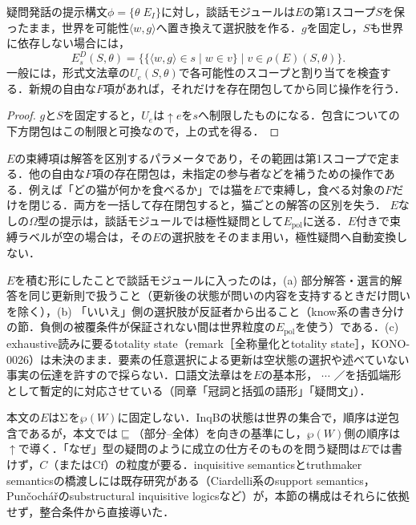 \documentclass[../../main-detail.tex]{subfiles}
\begin{document}
\begin{proposition}
    疑問発話の提示構文$\phi=\{\theta\;E_I\}$に対し，談話モジュールは$E$の第1スコープ$S$を保ったまま，世界を可能性$\langle w,g\rangle$へ置き換えて選択肢を作る．$g$を固定し，$S$も世界に依存しない場合には，
    \[
        E^D_s(S,\theta)=\{\{\langle w,g\rangle\in s\mid w\in v\}\mid v\in\rho(E)(S,\theta)\}.
    \]
    一般には，形式文法章の$U_e(S,\theta)$で各可能性のスコープと割り当てを検査する．新規の自由な$F$項があれば，それだけを存在閉包してから同じ操作を行う．
\end{proposition}
\begin{proof}
    $g$と$S$を固定すると，$U_e$は$\uparrow e$を$s$へ制限したものになる．包含についての下方閉包はこの制限と可換なので，上の式を得る．
\end{proof}
\begin{remark}[疑問位置と自由項]
    $E$の束縛項は解答を区別するパラメータであり，その範囲は第1スコープで定まる．他の自由な$F$項の存在閉包は，未指定の参与者などを補うための操作である．例えば「どの猫が何かを食べるか」では猫を$E$で束縛し，食べる対象の$F$だけを閉じる．両方を一括して存在閉包すると，猫ごとの解答の区別を失う．
    $E$なしの$\Omega$型の提示は，談話モジュールでは極性疑問として$E_{\mathrm{pol}}$に送る．$E$付きで束縛ラベルが空の場合は，その$E$の選択肢をそのまま用い，極性疑問へ自動変換しない．
\end{remark}
$E$を積む形にしたことで談話モジュールに入ったのは，(a) 部分解答・選言的解答を同じ更新則で扱うこと（更新後の状態が問いの内容を支持するときだけ問いを除く），(b) 「いいえ」側の選択肢が反証者から出ること（know系の書き分けの節．負側の被覆条件が保証されない間は世界粒度の$E_{\mathrm{pol}}$を使う）である．(c) exhaustive読みに要るtotality state（remark［全称量化とtotality state］，KONO-0026）は未決のまま．要素の任意選択による更新は空状態の選択や述べていない事実の伝達を許すので採らない．口語文法章はを$E$の基本形， $\cdots$ ／を括弧端形として暫定的に対応させている（同章「冠詞と括弧の語形」「疑問文」）．
\begin{remark}
    本文の$E$は$\Sigma$を$\wp(W)$に固定しない．InqBの状態は世界の集合で，順序は逆包含であるが，本文では$\sqsubseteq$（部分--全体）を向きの基準にし，$\wp(W)$側の順序は$\uparrow$で導く．「なぜ」型の疑問のように成立の仕方そのものを問う疑問は$E$では書けず，$C$（または$\mathrm{Cf}$）の粒度が要る．inquisitive semanticsとtruthmaker semanticsの橋渡しには既存研究がある（Ciardelli系のsupport semantics，Punčochářのsubstructural inquisitive logicsなど）が，本節の構成はそれらに依拠せず，整合条件から直接導いた．
\end{remark}
\end{document}
